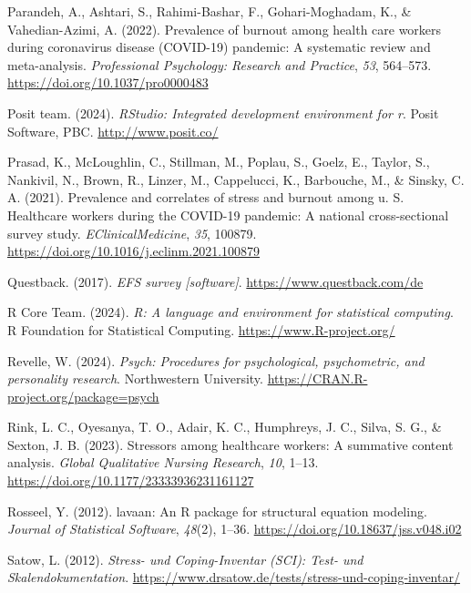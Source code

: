\documentclass[
  man]{apa6}
\newlength{\cslhangindent}
\newenvironment{CSLReferences}[2] %
 {\begin{list}{}{%
  \setlength{\itemindent}{0pt}
  \setlength{\leftmargin}{0pt}
  \setlength{\parsep}{0pt}
  \ifodd #1
   \setlength{\leftmargin}{\cslhangindent}
   \setlength{\itemindent}{-1\cslhangindent}
  \fi
  \setlength{\itemsep}{#2\baselineskip}}}
 {\end{list}}
\begin{document}
\begin{CSLReferences}{1}{0}
Parandeh, A., Ashtari, S., Rahimi-Bashar, F., Gohari-Moghadam, K., \& Vahedian-Azimi, A. (2022). Prevalence of burnout among health care workers during coronavirus disease ({COVID-19}) pandemic: A systematic review and meta-analysis. \emph{Professional Psychology: Research and Practice}, \emph{53}, 564--573. \url{https://doi.org/10.1037/pro0000483}

Posit team. (2024). \emph{RStudio: Integrated development environment for r}. Posit Software, PBC. \url{http://www.posit.co/}

Prasad, K., McLoughlin, C., Stillman, M., Poplau, S., Goelz, E., Taylor, S., Nankivil, N., Brown, R., Linzer, M., Cappelucci, K., Barbouche, M., \& Sinsky, C. A. (2021). Prevalence and correlates of stress and burnout among u. S. Healthcare workers during the COVID-19 pandemic: A national cross-sectional survey study. \emph{EClinicalMedicine}, \emph{35}, 100879. \url{https://doi.org/10.1016/j.eclinm.2021.100879}

Questback. (2017). \emph{EFS survey {[}software{]}}. \url{https://www.questback.com/de}

R Core Team. (2024). \emph{R: A language and environment for statistical computing}. R Foundation for Statistical Computing. \url{https://www.R-project.org/}

Revelle, W. (2024). \emph{Psych: Procedures for psychological, psychometric, and personality research}. Northwestern University. \url{https://CRAN.R-project.org/package=psych}

Rink, L. C., Oyesanya, T. O., Adair, K. C., Humphreys, J. C., Silva, S. G., \& Sexton, J. B. (2023). Stressors among healthcare workers: A summative content analysis. \emph{Global Qualitative Nursing Research}, \emph{10}, 1--13. \url{https://doi.org/10.1177/23333936231161127}

Rosseel, Y. (2012). {lavaan}: An {R} package for structural equation modeling. \emph{Journal of Statistical Software}, \emph{48}(2), 1--36. \url{https://doi.org/10.18637/jss.v048.i02}

Satow, L. (2012). \emph{{Stress- und Coping-Inventar (SCI): Test- und Skalendokumentation}}. \url{https://www.drsatow.de/tests/stress-und-coping-inventar/}


\end{CSLReferences}
\end{document}
